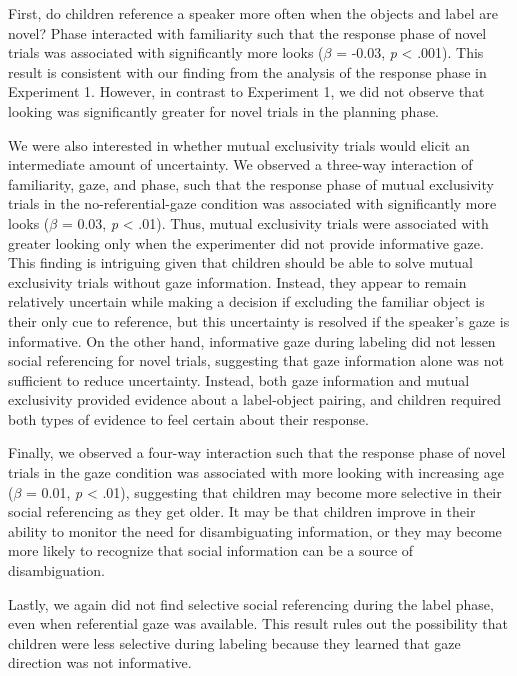 \documentclass[10pt, letterpaper]{article}
\begin{document}
First, do children reference a speaker more often when the objects and
label are novel? Phase interacted with familiarity such that the
response phase of novel trials was associated with significantly more
looks (\(\beta\) = -0.03, \emph{p} \textless{} .001). This result is
consistent with our finding from the analysis of the response phase in
Experiment 1. However, in contrast to Experiment 1, we did not observe
that looking was significantly greater for novel trials in the planning
phase.

We were also interested in whether mutual exclusivity trials would
elicit an intermediate amount of uncertainty. We observed a three-way
interaction of familiarity, gaze, and phase, such that the response
phase of mutual exclusivity trials in the no-referential-gaze condition
was associated with significantly more looks (\(\beta\) = 0.03, \emph{p}
\textless{} .01). Thus, mutual exclusivity trials were associated with
greater looking only when the experimenter did not provide informative
gaze. This finding is intriguing given that children should be able to
solve mutual exclusivity trials without gaze information. Instead, they
appear to remain relatively uncertain while making a decision if
excluding the familiar object is their only cue to reference, but this
uncertainty is resolved if the speaker's gaze is informative. On the
other hand, informative gaze during labeling did not lessen social
referencing for novel trials, suggesting that gaze information alone was
not sufficient to reduce uncertainty. Instead, both gaze information and
mutual exclusivity provided evidence about a label-object pairing, and
children required both types of evidence to feel certain about their
response.

Finally, we observed a four-way interaction such that the response phase
of novel trials in the gaze condition was associated with more looking
with increasing age (\(\beta\) = 0.01, \emph{p} \textless{} .01),
suggesting that children may become more selective in their social
referencing as they get older. It may be that children improve in their
ability to monitor the need for disambiguating information, or they may
become more likely to recognize that social information can be a source
of disambiguation.

Lastly, we again did not find selective social referencing during the
label phase, even when referential gaze was available. This result rules
out the possibility that children were less selective during labeling
because they learned that gaze direction was not informative.
\end{document}
